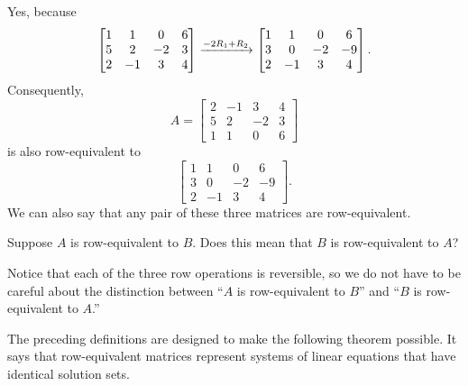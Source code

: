 \documentclass{ximera}
\begin{document}
\begin{example}
\begin{question}
    \begin{feedback}
      Yes, because
      \[
        \begin{bmatrix}
          1&1&0&6\\
          5&2&-2&3\\
          2&-1&3&4
        \end{bmatrix}
        \xrightarrow{-2R_{1}+R_{2}}
        \begin{bmatrix}
          1&1&0&6\\
          3&0&-2&-9\\
          2&-1&3&4
        \end{bmatrix}.
      \]
      Consequently, 
      \[
        A=\begin{bmatrix}
          2&-1&3&4\\
          5&2&-2&3\\
          1&1&0&6
        \end{bmatrix}
      \]
      is also row-equivalent to
      \[
        \begin{bmatrix}
          1&1&0&6\\
          3&0&-2&-9\\
          2&-1&3&4
        \end{bmatrix}.
      \]
      We can also say that any pair of these three matrices are row-equivalent.
    \end{feedback}
  \end{question}
\end{example}

\begin{exercise}
  Suppose $A$ is row-equivalent to $B$.  Does this mean that $B$ is row-equivalent to $A$?

  \begin{multipleChoice}
  \end{multipleChoice}  

  \begin{feedback}
    Notice that each of the three row operations is reversible, so we
    do not have to be careful about the distinction between ``$A$ is
    row-equivalent to $B$'' and ``$B$ is row-equivalent to $A$.''
  \end{feedback}
\end{exercise}

The preceding definitions are designed to make the following theorem possible.  It says that row-equivalent matrices represent systems of linear equations that have identical solution sets.
\end{document}
